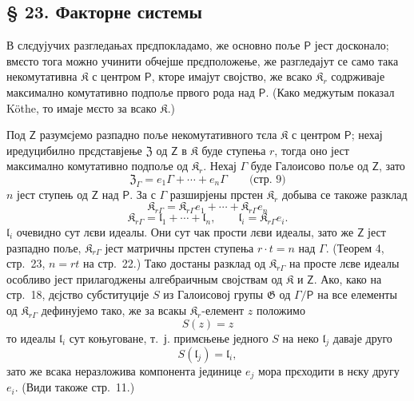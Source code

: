 \documentclass[11pt]{article}
\newcommand{\foreign}[1]{#1}
\begin{document}
\subsection*{§ 23. Факторне системы}\label{faktorensysteme}

В слєдујучих разгледањах прєдпокладамо, же основно поље \(\mathsf P\) јест досконало; вмєсто тога можно учинити обчејше прєдположење, же разгледајут се само така некомутативна \(\mathfrak K\) с центром \(\mathsf P\), кторе имајут својство, же всако \(\mathfrak K_r\) содрживаје максимално комутативно подпоље првого рода над \(\mathsf P\). (Како меджутым показал \foreign{Köthe}, то имаје мєсто за всако \(\mathfrak K\).)

Под \(\mathsf{Z}\) разумєјемо разпадно поље некомутативного тєла \(\mathfrak K\) с центром \(\mathsf P\); нехај иредуцибилно прєдставјење \(\mathfrak Z\) од \(\mathsf{Z}\) в \(\mathfrak K\) буде ступења \(r\), тогда оно јест максимално комутативно подпоље од \(\mathfrak K_r\). Нехај \(\Gamma\) буде Галоисово поље од \(\mathsf{Z}\), зато
\[
\mathfrak Z_\Gamma=e_1\Gamma+\cdots+e_n\Gamma
\qquad\text{(стр.~9)}
\]
\(n\) јест ступењ од \(\mathsf{Z}\) над \(\mathsf P\). За с \(\Gamma\) разширјены прстен \(\mathfrak K_r\) добыва се такоже разклад
\[
\mathfrak K_{r\Gamma}=\mathfrak K_{r\Gamma}e_1+\cdots+\mathfrak K_{r\Gamma}e_n
\]
\[
\mathfrak K_{r\Gamma}=\mathfrak l_1+\cdots+\mathfrak l_n,\qquad
\mathfrak l_i=\mathfrak K_{r\Gamma}e_i.
\]
\(\mathfrak l_i\) очевидно сут лєви идеалы. Они сут чак прости лєви идеалы, зато же \(\mathsf{Z}\) јест разпадно поље, \(\mathfrak K_{r\Gamma}\) јест матричны прстен ступења \(r\cdot t=n\) над \(\Gamma\). (Теорем 4, стр.~23, \(n=rt\) на стр.~22.) Тако достаны разклад од \(\mathfrak K_{r\Gamma}\) на просте лєве идеалы особливо јест прилагоджены алгебраичным својствам од \(\mathfrak K\) и \(\mathsf{Z}\). Ако, како на стр.~18, дєјство субституције \(S\) из Галоисовој групы \(\mathfrak G\) од \(\Gamma/\mathsf P\) на все елементы од \(\mathfrak K_{r\Gamma}\) дефинујемо тако, же за всакы \(\mathfrak K_r\)-елемент \(z\) положимо
\[
S(z)=z
\]
то идеалы \(\mathfrak l_i\) сут коњуговане, т.~ј. примєњење једного \(S\) на неко \(\mathfrak l_j\) даваје друго
\[
S(\mathfrak l_j)=\mathfrak l_i,
\]
зато же всака неразложива компонента јединице \(e_j\) мора прєходити в нєку другу \(e_i\). (Види такоже стр.~11.)
\end{document}
